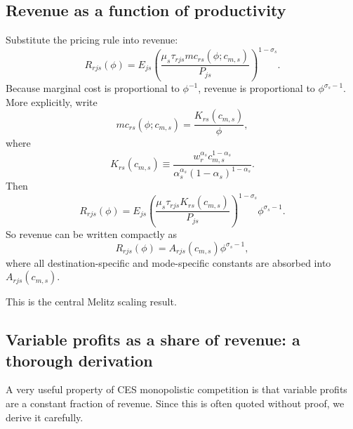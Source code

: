 \documentclass[11pt]{article}
\begin{document}
\subsection{Revenue as a function of productivity}

Substitute the pricing rule into revenue:
\begin{equation}
R_{rjs}(\phi)=E_{js}\left(\frac{\mu_s\tau_{rjs}mc_{rs}(\phi;c_{m,s})}{P_{js}}\right)^{1-\sigma_s}.
\end{equation}
Because marginal cost is proportional to \(\phi^{-1}\), revenue is proportional to \(\phi^{\sigma_s-1}\). More explicitly, write
\begin{equation}
mc_{rs}(\phi;c_{m,s})=\frac{K_{rs}(c_{m,s})}{\phi},
\end{equation}
where
\begin{equation}
K_{rs}(c_{m,s})\equiv\frac{w_r^{\alpha_s}c_{m,s}^{1-\alpha_s}}{\alpha_s^{\alpha_s}(1-\alpha_s)^{1-\alpha_s}}.
\end{equation}
Then
\begin{equation}
R_{rjs}(\phi)=E_{js}\left(\frac{\mu_s\tau_{rjs}K_{rs}(c_{m,s})}{P_{js}}\right)^{1-\sigma_s}\phi^{\sigma_s-1}.
\end{equation}
So revenue can be written compactly as
\begin{equation}
R_{rjs}(\phi)=A_{rjs}(c_{m,s})\phi^{\sigma_s-1},
\label{eq:revenue_phi_power}
\end{equation}
where all destination-specific and mode-specific constants are absorbed into \(A_{rjs}(c_{m,s})\).

This is the central Melitz scaling result.

\subsection{Variable profits as a share of revenue: a thorough derivation}

A very useful property of CES monopolistic competition is that variable profits are a constant fraction of revenue. Since this is often quoted without proof, we derive it carefully.
\end{document}
